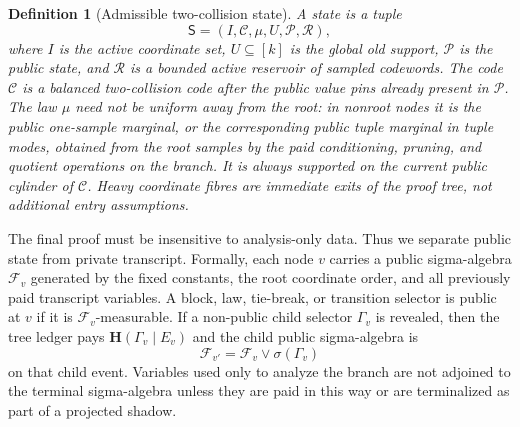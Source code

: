 \documentclass[11pt]{article}
\newtheorem{definition}[theorem]{Definition}
\newcommand{\C}{\mathcal C}
\newcommand{\bfH}{\mathbf H}
\begin{document}
\begin{definition}[Admissible two-collision state]
A state is a tuple
\[
  \mathsf S=(I,\C,\mu,U,\mathcal P,\mathcal R),
\]
where $I$ is the active coordinate set, $U\subseteq [k]$ is the global old
support,
$\mathcal P$ is the public state, and $\mathcal R$ is a bounded active
reservoir of sampled codewords.  The code $\C$ is a balanced two-collision
code after the public value pins already present in $\mathcal P$.  The law
$\mu$ need not be uniform away from the root: in nonroot nodes it is the public
one-sample marginal, or the corresponding public tuple marginal in tuple
modes, obtained from the root samples by the paid conditioning, pruning, and
quotient operations on the branch.  It is always supported on the current
public cylinder of $\C$.  Heavy coordinate fibres are immediate exits of the
proof tree, not additional entry assumptions.
\end{definition}

The final proof must be insensitive to analysis-only data.  Thus we separate
public state from private transcript.  Formally, each node $v$ carries a
public sigma-algebra $\mathcal F_v$ generated by the fixed constants, the root
coordinate order, and all previously paid transcript variables.  A block,
law, tie-break, or transition selector is public at $v$ if it is
$\mathcal F_v$-measurable.  If a non-public child selector $\Gamma_v$ is
revealed, then the tree ledger pays $\bfH(\Gamma_v\mid E_v)$ and the child
public sigma-algebra is
\[
  \mathcal F_{v'}=\mathcal F_v\vee \sigma(\Gamma_v)
\]
on that child event.  Variables used only to analyze the branch are not
adjoined to the terminal sigma-algebra unless they are paid in this way or
are terminalized as part of a projected shadow.
\end{document}
